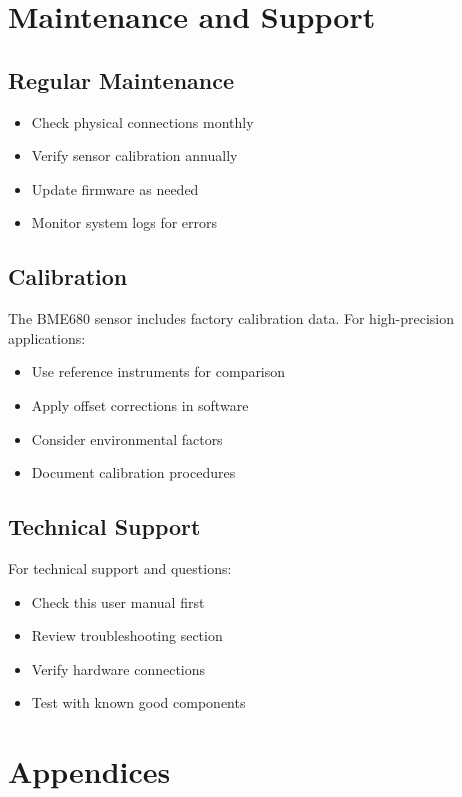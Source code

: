 \documentclass[11pt,a4paper]{article}
\begin{document}
\section{Maintenance and Support}

\subsection{Regular Maintenance}
\begin{itemize}
    \item Check physical connections monthly
    \item Verify sensor calibration annually
    \item Update firmware as needed
    \item Monitor system logs for errors
\end{itemize}

\subsection{Calibration}
The BME680 sensor includes factory calibration data. For high-precision applications:

\begin{itemize}
    \item Use reference instruments for comparison
    \item Apply offset corrections in software
    \item Consider environmental factors
    \item Document calibration procedures
\end{itemize}

\subsection{Technical Support}
For technical support and questions:

\begin{itemize}
    \item Check this user manual first
    \item Review troubleshooting section
    \item Verify hardware connections
    \item Test with known good components
\end{itemize}

\section{Appendices}
\end{document}
